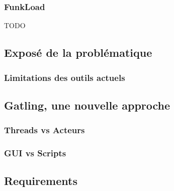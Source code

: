 \subsubsection{FunkLoad}
TODO

\subsection{Exposé de la problématique}
\subsubsection{Limitations des outils actuels}

\subsection{Gatling, une nouvelle approche}

\subsubsection{Threads vs Acteurs}
\subsubsection{GUI vs Scripts}

\subsection{Requirements}